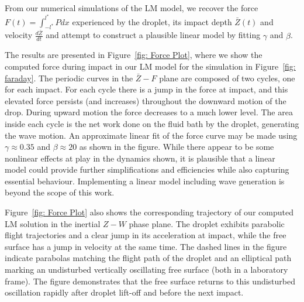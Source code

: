 From our numerical simulations of the LM model, we recover the force $F(t) = \int_{-l^*}^{l^*} P dx$ experienced by the droplet, its impact depth $\bar{Z}(t)$ and velocity $\frac{d\bar{Z}}{dt}$ and attempt to construct a plausible linear model by fitting $\gamma$ and $\beta$. 

The results are presented in Figure~\ref{fig: Force Plot}, where we show the computed force during impact in our LM model for the simulation in Figure~\ref{fig: faraday}. The periodic curves in the $\bar{Z}-F$ plane are composed of two cycles, one for each impact. For each cycle there is a jump in the force at impact, and this elevated force persists (and increases) throughout the downward motion of the drop. During upward motion the force decreases to a much lower level. The area inside each cycle is the net work done on the fluid bath by the droplet, generating the wave motion. An approximate linear fit of the force curve may be made using $\gamma \approx 0.35$ and $\beta \approx 20$ as shown in the figure. While there appear to be some nonlinear effects at play in the dynamics shown, it is plausible that a linear model could provide further simplifications and efficiencies while also capturing essential behaviour. Implementing a linear model including wave generation is beyond the scope of this work. 

Figure~\ref{fig: Force Plot} also shows the corresponding trajectory of our computed LM solution in the inertial $Z-W$ phase plane. The droplet exhibits parabolic flight trajectories and a clear jump in its acceleration at impact, while the free surface has a jump in velocity at the same time. The dashed lines in the figure indicate parabolas matching the flight path of the droplet and an elliptical path marking an undisturbed vertically oscillating free surface (both in a laboratory frame). The figure demonstrates that the free surface returns to this undisturbed oscillation rapidly after droplet lift-off and before the next impact.
